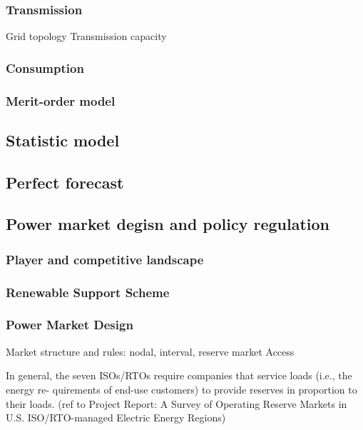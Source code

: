 \subsubsection{Transmission}
Grid topology
Transmission capacity

\subsubsection{Consumption}

\subsubsection{Merit-order model}
\cite{Sensfuss2008}

\cite{SaenzdeMiera2008}
\cite{Tveten2013}
\cite{McConnell2013}
\cite{Gelabert2011}
\cite{Clo2015}
\cite{Woo2016}
\cite{Cludius2014}
\cite{He2013}
\cite{Mulder2013}

\subsection{Statistic model}
\cite{Alipour2017}

\subsection{Perfect forecast}
\cite{He2011}
\cite{Sioshansi2009}
\cite{Bathurst2003}
\cite{Drury2011}
\cite{Connolly2012}

\subsection{Power market degisn and policy regulation}
\subsubsection{Player and competitive landscape}

\subsubsection{Renewable Support Scheme}

\subsubsection{Power Market Design}
Market structure and rules: nodal, interval, reserve market
Access

In general, the seven ISOs/RTOs require companies that service loads (i.e., the energy re- quirements of end-use customers) to provide reserves in proportion to their loads. (ref to Project Report: A Survey of Operating Reserve Markets in U.S. ISO/RTO-managed Electric Energy Regions)

